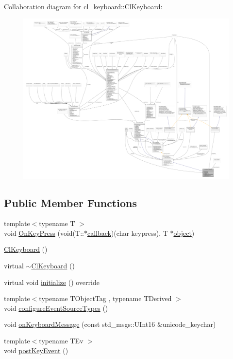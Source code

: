 Collaboration diagram for cl\+\_\+keyboard\+:\+:Cl\+Keyboard\+:
\nopagebreak
\begin{figure}[H]
\begin{center}
\leavevmode
\includegraphics[width=350pt]{classcl__keyboard_1_1ClKeyboard__coll__graph}
\end{center}
\end{figure}
\subsection*{Public Member Functions}
\begin{DoxyCompactItemize}
\item 
{\footnotesize template$<$typename T $>$ }\\void \hyperlink{classcl__keyboard_1_1ClKeyboard_ae9f4a6dc1ce18397394a432826970baa}{On\+Key\+Press} (void(T\+::$\ast$\hyperlink{3_2servers_2opencv__perception__node_2opencv__perception__node_8cpp_a050e697bd654facce10ea3f6549669b3}{callback})(char keypress), T $\ast$\hyperlink{classobject}{object})
\item 
\hyperlink{classcl__keyboard_1_1ClKeyboard_aadf021c18ad32c50bd8b02f62293a47e}{Cl\+Keyboard} ()
\item 
virtual \hyperlink{classcl__keyboard_1_1ClKeyboard_af2f4ffb66639acb158d57d627a56d8e8}{$\sim$\+Cl\+Keyboard} ()
\item 
virtual void \hyperlink{classcl__keyboard_1_1ClKeyboard_af7f7fd9871ef5fcca400cd59d7b60775}{initialize} () override
\item 
{\footnotesize template$<$typename T\+Object\+Tag , typename T\+Derived $>$ }\\void \hyperlink{classcl__keyboard_1_1ClKeyboard_a9e7061e65652a6a5b8ec34ba97e59195}{configure\+Event\+Source\+Types} ()
\item 
void \hyperlink{classcl__keyboard_1_1ClKeyboard_aff50ebe6b1b4aad0ea5b933ab0f00ef4}{on\+Keyboard\+Message} (const std\+\_\+msgs\+::\+U\+Int16 \&unicode\+\_\+keychar)
\item 
{\footnotesize template$<$typename T\+Ev $>$ }\\void \hyperlink{classcl__keyboard_1_1ClKeyboard_ac1311ce9a6a64e590df2e1b088f0e733}{post\+Key\+Event} ()
\end{DoxyCompactItemize}
